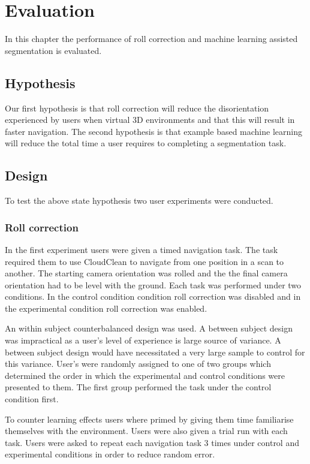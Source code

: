 \chapter{Evaluation} \label{ch:eval}

In this chapter the performance of roll correction and machine learning assisted segmentation is evaluated.

\section{Hypothesis}

Our first hypothesis is that roll correction will reduce the disorientation experienced by users when virtual 3D environments and that this will result in faster navigation. The second hypothesis is that example based machine learning will reduce the total time a user requires to completing a segmentation task.

\section{Design}

To test the above state hypothesis two user experiments were conducted.

\subsection{Roll correction}
In the first experiment users were given a timed navigation task. The task required them to use CloudClean to navigate from one position in a scan to another. The starting camera orientation was rolled and the the final camera orientation had to be level with the ground. Each task was performed under two conditions. In the control condition condition roll correction was disabled and in the experimental condition roll correction was enabled. 

An within subject counterbalanced design was used. A between subject design was impractical as a user's level of experience is large source of variance. A between subject design would have necessitated a very large sample to control for this variance. User's were randomly assigned to one of two groups which determined the order in which the experimental and control conditions were presented to them. The first group performed the task under the control condition first.

To counter learning effects users where primed by giving them time familiarise themselves with the environment. Users were also given a trial run with each task. Users were asked to repeat each navigation task 3 times under control and experimental conditions in order to reduce random error.


